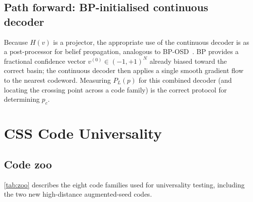 \documentclass[12pt,a4paper]{article}
\theoremstyle{plain}
\theoremstyle{definition}
\theoremstyle{remark}
\begin{document}
\subsection{Path forward: BP-initialised continuous decoder}

Because $H(v)$ is a projector, the appropriate use of the continuous
decoder is as a post-processor for belief propagation, analogous to
BP-OSD~\cite{Roffe2020}.
BP provides a fractional confidence vector $v^{(0)} \in (-1,+1)^N$ already
biased toward the correct basin; the continuous decoder then applies a
single smooth gradient flow to the nearest codeword.
Measuring $P_L(p)$ for this combined decoder (and locating the crossing
point across a code family) is the correct protocol for determining $p_c$.

\section{CSS Code Universality}\label{sec:universality}

\subsection{Code zoo}

\cref{tab:zoo} describes the eight code families used for universality testing,
including the two new high-distance augmented-seed codes.
\end{document}
